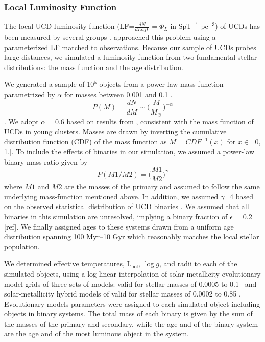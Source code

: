 \documentclass[manuscript]{aastex63}
\begin{document}
\subsubsection{ Local Luminosity Function }
The local UCD luminosity function (LF=$\frac{dN}{dLog L}= \Phi_L$ in SpT$^{-1}$ pc$^{-3}$) of UCDs has been measured by several groups \citep{2003AJ....126.2449R,2007astro.ph..2034C,2010AJ....139.2679B,2008ApJ...676.1281M,Reyle2010a,2019ApJS..240...19K,2019arXiv190604166B}. \cite{2016AJ....151...92R} approached this problem using a parameterized LF matched to observations. Because our sample of UCDs probes large distances, we simulated a luminosity function from two fundamental stellar distributions: the mass function and the age distribution. 

We generated a sample of 10$^5$ objects from a power-law mass function parametrized by $\alpha$ for masses between 0.001 \Msun and 0.1 \Msun. \begin{equation}  P(M) = \frac{dN}{dM} \sim \biggl( \frac{M}{M_\sun}\biggl)^{-\alpha}\end{equation}. We adopt $\alpha=0.6$ based on results from \cite{2019ApJS..240...19K}, consistent with the mass function of UCDs in young clusters. Masses are drawn by inverting the cumulative distribution function (CDF) of the mass function as $M= CDF^{-1} (x)$ for $x \in$ [0, 1.].  To include the effects of binaries in our simulation, we assumed a power-law binary mass ratio given by 
\begin{equation}
    P(M1/M2)= \biggl(\frac{M1}{M2}\biggl)^{\gamma}
\end{equation} where $M1$ and $M2$ are the masses of the primary and assumed to follow the same underlying mass-function mentioned above. In addition, we assumed $\gamma$=4 based on the observed statistical distribution of UCD binaries \citep{2007ApJ...659..655B}. We assumed that all binaries in this simulation are unresolved, implying a binary fraction of $\epsilon$ = 0.2 [ref]. We finally assigned ages to these systems drawn from a uniform age distribution spanning 100 Myr--10 Gyr which reasonably matches the local stellar population. 

We determined effective temperatures, L$_{\text{bol}}$, $\log g$, and radii to each of the simulated objects, using a log-linear interpolation of solar-metallicity evolutionary model grids of three sets of models: \cite{2003A&A...402..701B} valid for stellar masses of 0.0005 to 0.1 \Msun\ and solar-metallicity hybrid models of \cite{2008ApJ...689.1327S} valid for stellar masses of 0.0002 to 0.85 \Msun. Evolutionary models parameters were assigned to each simulated object including objects in binary systems. The total mass of each binary is given by the sum of the masses of the primary and secondary, while the age and \teff of the binary system are the age and \teff of the most luminous object in the system.
\end{document}
